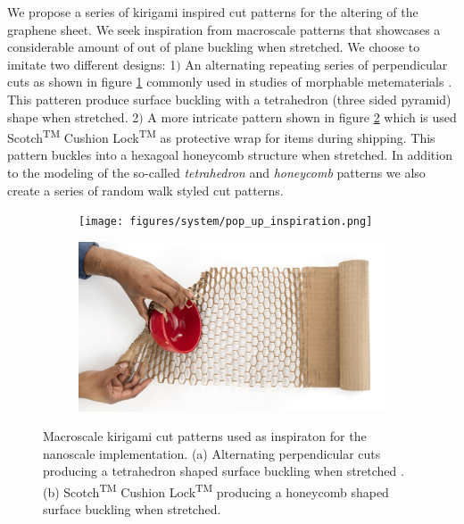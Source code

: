 We propose a series of kirigami inspired cut patterns for the altering of the graphene sheet. We seek inspiration from macroscale patterns that showcases a considerable amount of out of plane buckling when stretched. We choose to imitate two different designs: 1$)$ An alternating repeating series of perpendicular cuts as shown in figure \ref{fig:kirigami_inspiration_a} commonly used in studies of morphable metematerials \cite{new_pop_up}. This patteren produce surface buckling with a tetrahedron (three sided pyramid) shape when stretched. 2$)$ A more intricate pattern shown in figure \ref{fig:kirigami_inspiration_b} which is used Scotch\textsuperscript{TM} Cushion Lock\textsuperscript{TM} \cite{cushion_wrap} as protective wrap for items during shipping. This pattern buckles into a hexagoal honeycomb structure when stretched. In addition to the modeling of the so-called \textit{tetrahedron} and \textit{honeycomb} patterns we also create a series of random walk styled cut patterns.


\begin{figure}[H]
  \centering
  \begin{subfigure}[t]{0.48\textwidth}
      \centering
      \texttt{[image: figures/system/pop\_up\_inspiration.png]}
      \caption{}
      \label{fig:kirigami_inspiration_a}
    \end{subfigure}
    \hfill
    \begin{subfigure}[t]{0.48\textwidth}
      \centering
      \includegraphics[width=\textwidth]{figures/system/honeycomb_inspiration.jpg}
      \caption{}
      \label{fig:kirigami_inspiration_b}
  \end{subfigure}
  \hfill
     \caption{Macroscale kirigami cut patterns used as inspiraton for the nanoscale implementation. (a) Alternating perpendicular cuts producing a tetrahedron shaped surface buckling when stretched \cite{new_pop_up}. (b) Scotch\textsuperscript{TM} Cushion Lock\textsuperscript{TM} \cite{cushion_wrap} producing a honeycomb shaped surface buckling when stretched.}
     \label{fig:kirigami_inspiration}
\end{figure}

